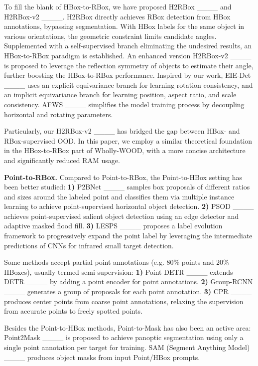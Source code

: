 To fill the blank of HBox-to-RBox, we have proposed H2RBox ____ and H2RBox-v2 ____. H2RBox directly achieves RBox detection from HBox annotations, bypassing segmentation. With HBox labels for the same object in various orientations, the geometric constraint limits candidate angles. Supplemented with a self-supervised branch eliminating the undesired results, an HBox-to-RBox paradigm is established. An enhanced version H2RBox-v2 ____ is proposed to leverage the reflection symmetry of objects to estimate their angle, further boosting the HBox-to-RBox performance. Inspired by our work, EIE-Det ____ uses an explicit equivariance branch for learning rotation consistency, and an implicit equivariance branch for learning position, aspect ratio, and scale consistency. AFWS ____ simplifies the model training process by decoupling horizontal and rotating parameters.

Particularly, our H2RBox-v2 ____ has bridged the gap between HBox- and RBox-supervised OOD. In this paper, we employ a similar theoretical foundation in the HBox-to-RBox part of Wholly-WOOD, with a more concise architecture and significantly reduced RAM usage.

\textbf{Point-to-RBox.} Compared to Point-to-RBox, the Point-to-HBox setting has been better studied: \textbf{1)} P2BNet ____ samples box proposals of different ratios and sizes around the labeled point and classifies them via multiple instance learning to achieve point-supervised horizontal object detection. \textbf{2)} PSOD ____ achieves point-supervised salient object detection using an edge detector and adaptive masked flood fill. \textbf{3)} LESPS ____ proposes a label evolution framework to progressively expand the point label by leveraging the intermediate predictions of CNNs for infrared small target detection.

Some methods accept partial point annotations (e.g. 80\% points and 20\% HBoxes), usually termed semi-supervision: 
\textbf{1)} Point DETR ____ extends DETR ____ by adding a point encoder for point annotations. 
\textbf{2)} Group-RCNN ____ generates a group of proposals for each point annotation.
\textbf{3)} CPR ____ produces center points from coarse point annotations, relaxing the supervision from accurate points to freely spotted points.

Besides the Point-to-HBox methods, Point-to-Mask has also been an active area: Point2Mask ____ is proposed to achieve panoptic segmentation using only a single point annotation per target for training. SAM (Segment Anything Model) ____ produces object masks from input Point/HBox prompts.

